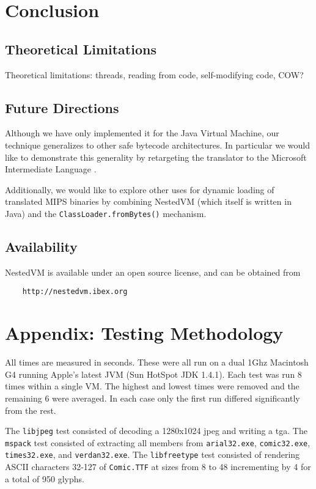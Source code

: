 \documentclass{acmconf}
\begin{document}
\section{Conclusion}

\subsection{Theoretical Limitations}

Theoretical limitations: threads, reading from code, self-modifying
code, COW?

\subsection{Future Directions}

Although we have only implemented it for the Java Virtual Machine, our
technique generalizes to other safe bytecode architectures.  In
particular we would like to demonstrate this generality by retargeting
the translator to the Microsoft Intermediate Language \cite{msil}.

Additionally, we would like to explore other uses for dynamic loading
of translated MIPS binaries by combining NestedVM (which itself is
written in Java) and the {\tt ClassLoader.fromBytes()} mechanism.

\subsection{Availability}

NestedVM is available under an open source license, and can be
obtained from
\begin{verbatim}
    http://nestedvm.ibex.org
\end{verbatim}

\appendix
\section{Appendix: Testing Methodology}

All times are measured in seconds. These were all run on a dual 1Ghz
Macintosh G4 running Apple's latest JVM (Sun HotSpot JDK 1.4.1). Each
test was run 8 times within a single VM. The highest and lowest times
were removed and the remaining 6 were averaged.  In each case only the
first run differed significantly from the rest.

The {\tt libjpeg} test consisted of decoding a 1280x1024 jpeg and
writing a tga.  The {\tt mspack} test consisted of extracting all
members from {\tt arial32.exe}, {\tt comic32.exe}, {\tt times32.exe},
and {\tt verdan32.exe}. The {\tt libfreetype} test consisted of
rendering ASCII characters 32-127 of {\tt Comic.TTF} at sizes from 8
to 48 incrementing by 4 for a total of 950 glyphs.


\end{document}
